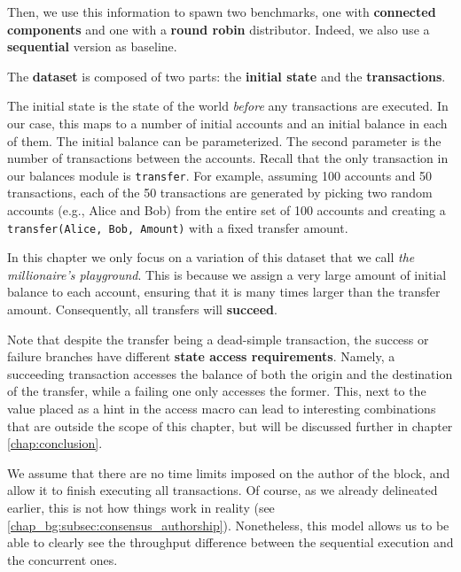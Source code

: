 Then, we use this information to spawn two benchmarks, one with \textbf{connected components} and
one with a \textbf{round robin} distributor. Indeed, we also use a \textbf{sequential} version as
baseline.

The \textbf{dataset} is composed of two parts: the \textbf{initial state} and the
\textbf{transactions}.

The initial state is the state of the world \textit{before} any transactions are executed. In our
case, this maps to a number of initial accounts and an initial balance in each of them. The initial
balance can be parameterized. The second parameter is the number of transactions between the
accounts. Recall that the only transaction in our balances module is \texttt{transfer}. For example,
assuming 100 accounts and 50 transactions, each of the 50 transactions are generated by picking two
random accounts (e.g., Alice and Bob) from the entire set of 100 accounts and creating a
\texttt{transfer(Alice, Bob, Amount)} with a fixed transfer amount.

In this chapter we only focus on a variation of this dataset that we call \textit{the millionaire's
playground}. This is because we assign a very large amount of initial balance to each account,
ensuring that it is many times larger than the transfer amount. Consequently, all transfers will
\textbf{succeed}.

Note that despite the transfer being a dead-simple transaction, the success or failure branches have
different \textbf{state access requirements}. Namely, a succeeding transaction accesses the
balance of both the origin and the destination of the transfer, while a failing one only
accesses the former. This, next to the value placed as a hint in the access macro can lead to
interesting combinations that are outside the scope of this chapter, but will be discussed
further in chapter \ref{chap:conclusion}.

We assume that there are no time limits imposed on the author of the block, and allow it to finish
executing all transactions. Of course, as we already delineated earlier, this is not how things work
in reality (see \ref{chap_bg:subsec:consensus_authorship}). Nonetheless, this model allows us to be
able to clearly see the throughput difference between the sequential execution and the concurrent
ones.

